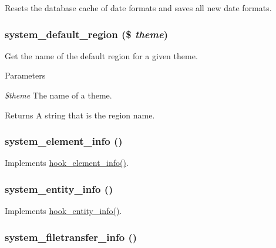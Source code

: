 \label{system_8module_a963e54c5eae58e038d83b387bda7a9b8}
Resets the database cache of date formats and saves all new date formats. \hypertarget{system_8module_a8d1d2449c553874ab0ba1d2a4b132fd3}{
\subsubsection[{system\_\-default\_\-region}]{\setlength{\rightskip}{0pt plus 5cm}system\_\-default\_\-region (\$ {\em theme})}}
\label{system_8module_a8d1d2449c553874ab0ba1d2a4b132fd3}
Get the name of the default region for a given theme.


\begin{DoxyParams}{Parameters}
\item[{\em \$theme}]The name of a theme. \end{DoxyParams}
\begin{DoxyReturn}{Returns}
A string that is the region name. 
\end{DoxyReturn}
\hypertarget{system_8module_a39faa9a5430a70bb37a3c8af72460a14}{
\subsubsection[{system\_\-element\_\-info}]{\setlength{\rightskip}{0pt plus 5cm}system\_\-element\_\-info ()}}
\label{system_8module_a39faa9a5430a70bb37a3c8af72460a14}
Implements \hyperlink{group__hooks_ga3c5182432eddc82f8b7845e66a365d51}{hook\_\-element\_\-info()}. \hypertarget{system_8module_ad12d07929306617e476e0ddc18d1129f}{
\subsubsection[{system\_\-entity\_\-info}]{\setlength{\rightskip}{0pt plus 5cm}system\_\-entity\_\-info ()}}
\label{system_8module_ad12d07929306617e476e0ddc18d1129f}
Implements \hyperlink{group__hooks_gaf02318e9d0e8cdbf6d187b271b9969a8}{hook\_\-entity\_\-info()}. \hypertarget{system_8module_a56c90d331efe545cec21cc4cc9cede5f}{
\subsubsection[{system\_\-filetransfer\_\-info}]{\setlength{\rightskip}{0pt plus 5cm}system\_\-filetransfer\_\-info ()}}
